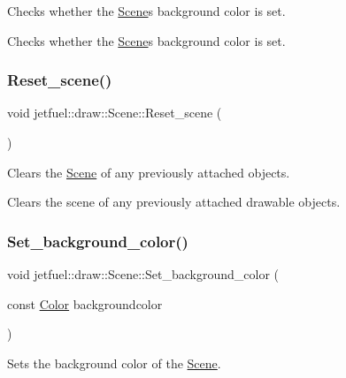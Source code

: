 Checks whether the \hyperlink{classjetfuel_1_1draw_1_1Scene}{Scene}\textquotesingle{}s background color is set. 

Checks whether the \hyperlink{classjetfuel_1_1draw_1_1Scene}{Scene}\textquotesingle{}s background color is set. \mbox{\label{classjetfuel_1_1draw_1_1Scene_a6ee0359540800521294fda5d1d8b86b1}} 
\subsubsection{\texorpdfstring{Reset\+\_\+scene()}{Reset\_scene()}}
{\footnotesize\ttfamily void jetfuel\+::draw\+::\+Scene\+::\+Reset\+\_\+scene (\begin{DoxyParamCaption}{ }\end{DoxyParamCaption})\hspace{0.3cm}{\ttfamily [inline]}}



Clears the \hyperlink{classjetfuel_1_1draw_1_1Scene}{Scene} of any previously attached objects. 

Clears the scene of any previously attached drawable objects. \mbox{\label{classjetfuel_1_1draw_1_1Scene_aa3d099d358cd8ad9274d633805f3cc43}} 
\subsubsection{\texorpdfstring{Set\+\_\+background\+\_\+color()}{Set\_background\_color()}}
{\footnotesize\ttfamily void jetfuel\+::draw\+::\+Scene\+::\+Set\+\_\+background\+\_\+color (\begin{DoxyParamCaption}\item[{const \hyperlink{classjetfuel_1_1draw_1_1Color}{Color}}]{backgroundcolor }\end{DoxyParamCaption})\hspace{0.3cm}{\ttfamily [inline]}}



Sets the background color of the \hyperlink{classjetfuel_1_1draw_1_1Scene}{Scene}. 

